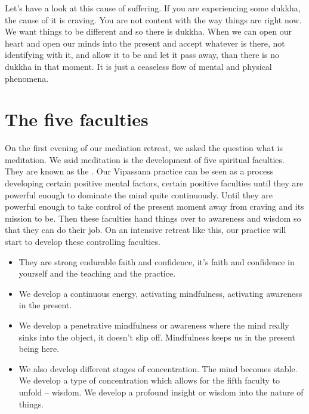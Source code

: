 \documentclass[letterpaper,10pt,english]{sphinxmanual}
\begin{document}
\sphinxAtStartPar
Let’s  have  a  look  at  this  cause  of  suffering.  If  you  are  experiencing
some dukkha, the cause of it is craving. You are not content with the way
things are right now. We want things to be different and so there is dukkha.
When we can open our heart and open our minds into the present and accept
whatever is there, not identifying with it, and allow it to be and let it pass
away, than there is no dukkha in that moment. It is just a ceaseless flow of
mental and physical phenomena.


\section{The five faculties}
\label{\detokenize{5-a:the-five-faculties}}
\sphinxAtStartPar
On  the  first  evening  of  our  mediation  retreat,  we  asked  the  question
what is meditation. We said meditation is the development of five spiritual
faculties. They are known as the
. Our Vipassana practice can be seen
as a process developing certain positive mental factors, certain positive faculties until they are powerful enough to dominate the mind quite continuously. Until they are powerful enough to take control of the present moment
away from craving and its mission to be. Then these faculties hand things
over to awareness and wisdom so that they can do their job. On an intensive
retreat like this, our practice will start to develop these controlling faculties.
\begin{itemize}
\item {} 
\sphinxAtStartPar
{} They  are  strong  endurable  faith  and  confidence,  it’s  faith  and  confidence in yourself and the teaching and the practice.

\item {} 
\sphinxAtStartPar
We  develop  a  continuous  energy,  activating  mindfulness,  activating    awareness in the present.

\item {} 
\sphinxAtStartPar
We  develop  a  penetrative  mindfulness  or  awareness  where  the  mind really sinks into the object, it doesn’t slip off. Mindfulness keeps us in the present being here.

\item {} 
\sphinxAtStartPar
We also develop different stages of concentration. The mind becomes
stable. We develop a type of concentration which allows for the fifth
faculty to unfold – wisdom. We develop a profound insight or wisdom
into the nature of things.

\end{itemize}
\end{document}
